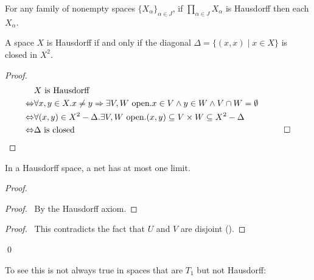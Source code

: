 \begin{corollary}
    For any family of nonempty spaces $\{ X_\alpha \}_{\alpha \in J}$, if
    $\prod_{\alpha \in J} X_\alpha$ is Hausdorff then each $X_\alpha$.
\end{corollary}

\begin{proposition}
    A space $X$ is Hausdorff if and only if the diagonal $\Delta = \{ (x,x) \mid x \in X \}$ is closed in $X^2$.
\end{proposition}

\begin{proof}
    \pf
    \begin{align*}
        & X \text{ is Hausdorff} \\
        \Leftrightarrow & \forall x,y \in X. x \neq y \Rightarrow \exists V, W \text{ open}. x \in V \wedge y \in W \wedge V \cap W = \emptyset \\
        \Leftrightarrow & \forall (x,y) \in X^2 - \Delta. \exists V,W \text{ open}. (x,y) \subseteq V \times W \subseteq X^2 - \Delta \\
        \Leftrightarrow & \Delta \text{ is closed} & \qed
    \end{align*}
\end{proof}

\begin{theorem}
    In a Hausdorff space, a net has at most one limit.
\end{theorem}

\begin{proof}
    \pf
    \begin{proof}
        \pf\ By the Hausdorff axiom.
    \end{proof}
    \qedstep
    \begin{proof}
        \pf\ This contradicts the fact that $U$ and $V$ are disjoint ().
    \end{proof}
    \qed
\end{proof}

To see this is not always true in spaces that are $T_1$ but not Hausdorff:

